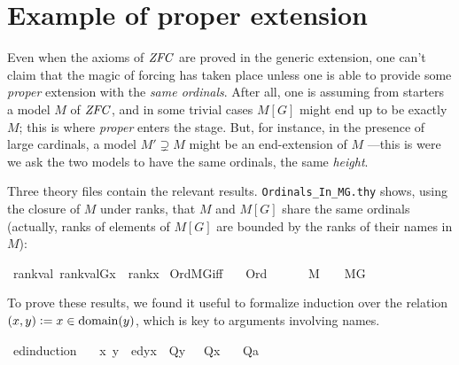 \section{Example of proper extension}
\label{sec:example-proper-extension}

Even when the axioms of $\mathit{ZFC}$ are proved in the generic extension,
one can't claim that the magic of forcing has taken place unless one
is able to provide some \emph{proper} extension with the \emph{same
ordinals}. After all, one is assuming from starters a model $M$ of $\mathit{ZFC}$,
and in some trivial cases $M[G]$ might end up to be exactly $M$; this
is where \emph{proper} enters the stage. But, for instance, in the
presence of large cardinals, a model $M'\supsetneq M$ might be an
end-extension of $M$ ---this is were we ask the two models to have the
same ordinals, the same \emph{height}. 

Three theory files contain the relevant
results. \verb|Ordinals_In_MG.thy| shows, using the closure of $M$
under ranks, that $M$ and $M[G]$ share the same ordinals (actually,
ranks of elements of $M[G]$ are bounded by the ranks of their names in
$M$):
\begin{isabelle}
\isamarkupfalse%
\ rank{\isacharunderscore}val{\isacharcolon}\ {\isachardoublequoteopen}rank{\isacharparenleft}val{\isacharparenleft}G{\isacharcomma}x{\isacharparenright}{\isacharparenright}\ {\isasymle}\ rank{\isacharparenleft}x{\isacharparenright}{\isachardoublequoteclose}\isanewline
{}\isamarkupfalse%
\ Ord{\isacharunderscore}MG{\isacharunderscore}iff{\isacharcolon}\isanewline
\ \ \ {\isachardoublequoteopen}Ord{\isacharparenleft}{\isasymalpha}{\isacharparenright}{\isachardoublequoteclose}\ \isanewline
\ \ \ {\isachardoublequoteopen}{\isasymalpha}\ {\isasymin}\ M\ {\isasymlongleftrightarrow}\ {\isasymalpha}\ {\isasymin}\ M{\isacharbrackleft}G{\isacharbrackright}{\isachardoublequoteclose}
\end{isabelle}

To prove these results, we found it useful to formalize induction over
the relation $(x,y) \mathrel{\mathop:}= x\in\operatorname{domain}(y)$, which is key
to arguments involving names.
\begin{isabelle}
\isamarkupfalse%
\ ed{\isacharunderscore}induction{\isacharcolon}\isanewline
\ \ \ {\isachardoublequoteopen}{\isasymAnd}x{\isachardot}\ {\isasymlbrakk}{\isasymAnd}y{\isachardot}\ \ ed{\isacharparenleft}y{\isacharcomma}x{\isacharparenright}\ {\isasymLongrightarrow}\ Q{\isacharparenleft}y{\isacharparenright}\ {\isasymrbrakk}\ {\isasymLongrightarrow}\ Q{\isacharparenleft}x{\isacharparenright}{\isachardoublequoteclose}\isanewline
\ \ \ {\isachardoublequoteopen}Q{\isacharparenleft}a{\isacharparenright}{\isachardoublequoteclose}
\end{isabelle}

